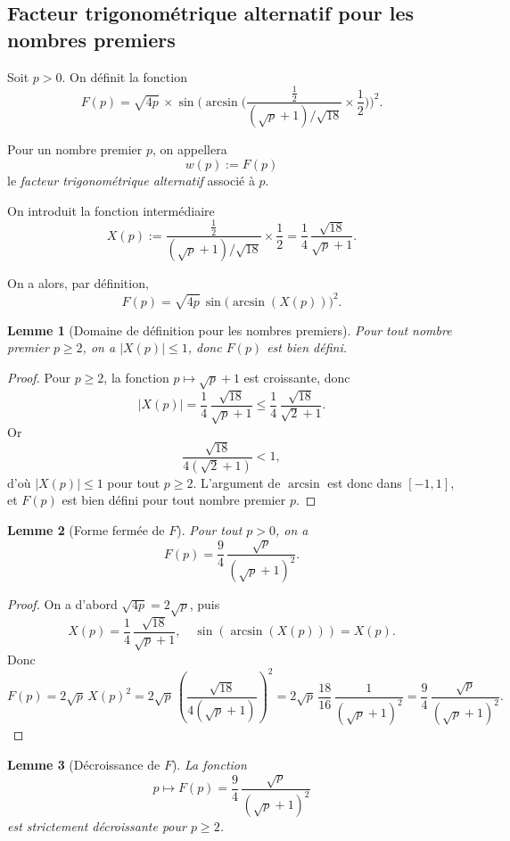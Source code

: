 \documentclass[12pt,a4paper]{article}
\newtheorem{lemma}{Lemme}
\theoremstyle{definition}
\theoremstyle{remark}
\begin{document}
\subsection{Facteur trigonométrique alternatif pour les nombres premiers}

Soit $p > 0$. On définit la fonction
\[
F(p)
= \sqrt{4p}\,\times
  \sin\!\Biggl(
    \arcsin\Biggl(
      \frac{\tfrac{1}{2}}{(\sqrt{p}+1)/\sqrt{18}} \times \frac{1}{2}
    \Biggr)
  \Biggr)^{2}.
\]

Pour un nombre premier $p$, on appellera
\[
w(p) := F(p)
\]
le \emph{facteur trigonométrique alternatif} associé à $p$.


On introduit la fonction intermédiaire
\[
X(p)
:= \frac{\tfrac{1}{2}}{(\sqrt{p}+1)/\sqrt{18}} \times \frac{1}{2}
= \frac{1}{4}\,\frac{\sqrt{18}}{\sqrt{p}+1}.
\]

On a alors, par définition,
\[
F(p) = \sqrt{4p}\,\sin\bigl(\arcsin(X(p))\bigr)^{2}.
\]

\begin{lemma}[Domaine de définition pour les nombres premiers]
Pour tout nombre premier $p \ge 2$, on a $|X(p)| \le 1$, donc $F(p)$ est bien défini.
\end{lemma}

\begin{proof}
Pour $p \ge 2$, la fonction $p \mapsto \sqrt{p}+1$ est croissante, donc
\[
|X(p)|
= \frac{1}{4}\,\frac{\sqrt{18}}{\sqrt{p}+1}
\le \frac{1}{4}\,\frac{\sqrt{18}}{\sqrt{2}+1}.
\]
Or
\[
\frac{\sqrt{18}}{4(\sqrt{2}+1)} < 1,
\]
d’où $|X(p)| \le 1$ pour tout $p \ge 2$. L’argument de $\arcsin$ est donc dans $[-1,1]$, et $F(p)$ est bien défini pour tout nombre premier $p$.
\end{proof}

\begin{lemma}[Forme fermée de $F$]
Pour tout $p > 0$, on a
\[
F(p)
= \frac{9}{4}\,\frac{\sqrt{p}}{(\sqrt{p}+1)^{2}}.
\]
\end{lemma}

\begin{proof}
On a d’abord $\sqrt{4p} = 2\sqrt{p}$, puis
\[
X(p)
= \frac{1}{4}\,\frac{\sqrt{18}}{\sqrt{p}+1},
\quad
\sin(\arcsin(X(p))) = X(p).
\]
Donc
\[
F(p)
= 2\sqrt{p}\,X(p)^{2}
= 2\sqrt{p}\,\left(\frac{\sqrt{18}}{4(\sqrt{p}+1)}\right)^{2}
= 2\sqrt{p}\,\frac{18}{16}\,\frac{1}{(\sqrt{p}+1)^{2}}
= \frac{9}{4}\,\frac{\sqrt{p}}{(\sqrt{p}+1)^{2}}.
\]
\end{proof}

\begin{lemma}[Décroissance de $F$]
La fonction
\[
p \mapsto F(p) = \frac{9}{4}\,\frac{\sqrt{p}}{(\sqrt{p}+1)^{2}}
\]
est strictement décroissante pour $p \ge 2$.
\end{lemma}
\end{document}

